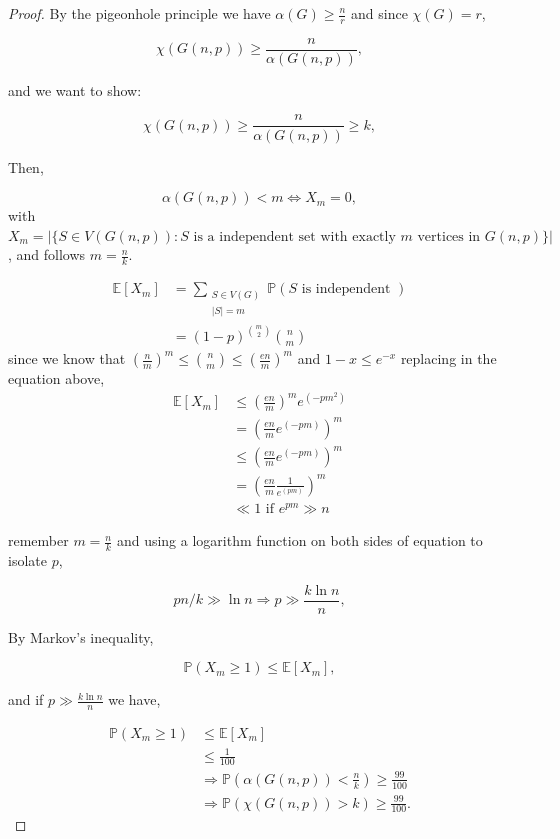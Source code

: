 \documentclass[12pt,twoside,a4paper]{book}
\numberwithin{equation}{section}
\let\log=\ln
\theoremstyle{remark}
\begin{document}
\begin{proof}
By the pigeonhole principle we have $\alpha (G) \geq \frac{n}{r}$ and since $\chi(G)=r$,

$$\chi(G(n,p)) \geq \frac{n}{\alpha(G(n,p))},$$

and we want to show:

$$\chi(G(n,p)) \geq \frac{n}{\alpha(G(n,p))} \geq k ,$$

Then,

$$\alpha(G(n,p)) < m \iff X_m=0 ,$$
with 
$X_m = \big|\{S\in V(G(n,p))\colon \text{$S$ is a independent set with exactly $m$ vertices in $G(n,p)$}\}\big|$,
and follows $m = \frac{n}{k}$. 

\begin{align*}
\mathbb{E}[X_m]&=\sum_{\substack{S \in V(G) \\ |S| = m}} \mathbb{P}(S\text{ is independent })\\
&=(1-p)^{\binom{m}{2}} \binom{n}{m}
\end{align*}
since we know that $\left(\frac{n}{m}\right)^m \leq \binom{n}{m} \leq \left(\frac{en}{m}\right)^m$ and $1-x \leq e^{-x}$ replacing in the equation above,
\begin{align*}
\mathbb{E}[X_m] &\leq \left(\frac{en}{m}\right)^m  e^{(-pm^2)} \\
&= \left(\frac{en}{m} e^{(-pm)}\right)^m\\
&\leq \left(\frac{en}{m} e^{(-pm)}\right)^m \\
&= \left(\frac{en}{m}\frac{1}{e^{(pm)}}\right)^m  \\
&\ll 1 \text{ if } e^{pm} \gg n
\end{align*}

remember $m =\frac{n}{k}$ and using a logarithm function on both sides of equation to isolate $p$,

$$ pn/k \gg \log n \Rightarrow p \gg \frac{k\log n}{n},$$
 
 By Markov's inequality,
 
 $$ \mathbb{P}(X_m \geq 1) \leq \mathbb{E}[X_m] ,$$
 
and if $p \gg \frac{k \log n}{n}$ we have,
 
 \begin{align*}
\mathbb{P}(X_m \geq 1) &\leq \mathbb{E}[X_m] \\
&\leq \frac{1}{100}  \\
&\Rightarrow \mathbb{P}(\alpha (G(n,p)) < \frac{n}{k}) \geq \frac{99}{100}\\ 
&\Rightarrow  \mathbb{P}(\chi(G(n,p)) > k) \geq \frac{99}{100}.
\end{align*}


\end{proof}
\end{document}
